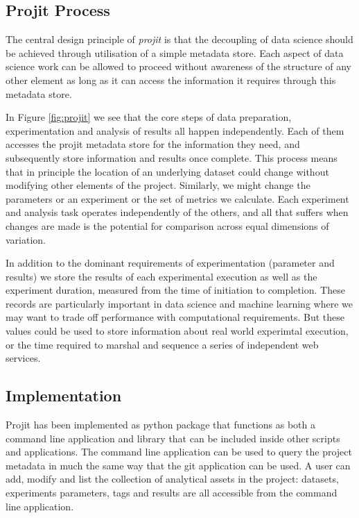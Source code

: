 \documentclass[sigconf]{acmart}
\begin{document}
\subsection{Projit Process}

The central design principle of \textit{projit} is that the decoupling of data science 
should be achieved through utilisation of a simple metadata store. Each aspect of 
data science work can be allowed to proceed without awareness of the structure of 
any other element as long as it can access the information it requires through this
metadata store.

In Figure \ref{fig:projit} we see that the core steps of data preparation, experimentation
and analysis of results all happen independently. Each of them accesses the projit metadata 
store for the information they need, and subsequently store information and results once complete.
This process means that in principle the location of an underlying dataset could change without
modifying other elements of the project. Similarly, we might change the parameters or an experiment
or the set of metrics we calculate. Each experiment and analysis task operates independently of the
others, and all that suffers when changes are made is the potential for comparison across equal
dimensions of variation.

In addition to the dominant requirements of experimentation (parameter and results) we store the results
of each experimental execution as well as the experiment duration, measured from the time of initiation
to completion. These records are particularly important in data science and machine learning where we
may want to trade off performance with computational requirements. But these values could be used to store
information about real world experimtal execution, or the time required to marshal and sequence a series
of independent web services. 


\subsection{Implementation}

Projit has been implemented as python package that functions as both a command line application
and library that can be included inside other scripts and applications. The command line application
can be used to query the project metadata in much the same way that the git application can be used.
A user can add, modify and list the collection of analytical assets in the project: datasets, experiments 
parameters, tags and results are all accessible from the command line application.
\end{document}
